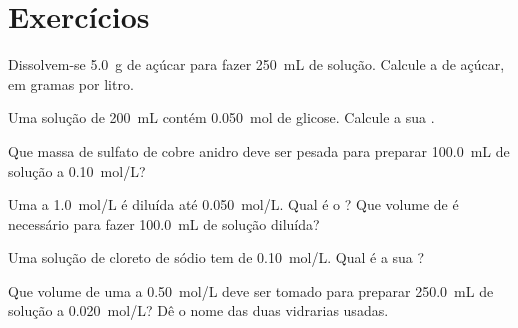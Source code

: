 \section{Exercícios}

\begin{exercise}[$\star$]\label{exo:g10:concentration-and-dilution:1}
Dissolvem-se \qty{5.0}{g} de açúcar para fazer \qty{250}{mL} de solução.
Calcule a  de açúcar, em gramas por litro.
\end{exercise}

\begin{exercise}[$\star$]\label{exo:g10:concentration-and-dilution:2}
Uma solução de \qty{200}{mL} contém \qty{0.050}{mol} de glicose. Calcule
a sua .
\end{exercise}

\begin{exercise}[$\star$]\label{exo:g10:concentration-and-dilution:3}
Que massa de sulfato de cobre anidro  deve ser pesada para
preparar \qty{100.0}{mL} de solução a \qty{0.10}{mol/L}?
\end{exercise}

\begin{exercise}[$\star$]\label{exo:g10:concentration-and-dilution:4}
Uma  a \qty{1.0}{mol/L} é diluída até \qty{0.050}{mol/L}.
Qual é o ? Que volume de  é necessário
para fazer \qty{100.0}{mL} de solução diluída?
\end{exercise}

\begin{exercise}[$\star$]\label{exo:g10:concentration-and-dilution:5}
Uma solução de cloreto de sódio tem  de
\qty{0.10}{mol/L}. Qual é a sua ?
\end{exercise}

\begin{exercise}[$\star\star$]\label{exo:g10:concentration-and-dilution:6}
Que volume de uma  a \qty{0.50}{mol/L} deve ser tomado
para preparar \qty{250.0}{mL} de solução a \qty{0.020}{mol/L}? Dê o nome
das duas vidrarias usadas.
\end{exercise}

